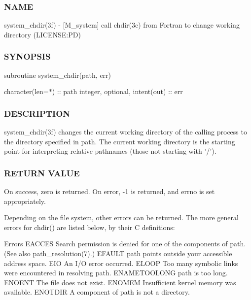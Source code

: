\subsubsection*{N\+A\+ME}

system\+\_\+chdir(3f) -\/ \mbox{[}M\+\_\+system\mbox{]} call chdir(3c) from Fortran to change working directory (L\+I\+C\+E\+N\+SE\+:PD) \subsubsection*{S\+Y\+N\+O\+P\+S\+IS}

subroutine system\+\_\+chdir(path, err)

character(len=$\ast$) \+:\+: path integer, optional, intent(out) \+:\+: err

\subsubsection*{D\+E\+S\+C\+R\+I\+P\+T\+I\+ON}

\begin{DoxyVerb}system_chdir(3f) changes the current working directory of the calling
process to the directory specified in path. The current working
directory is the starting point for interpreting relative pathnames
(those not starting with '/').
\end{DoxyVerb}


\subsubsection*{R\+E\+T\+U\+RN V\+A\+L\+UE}

\begin{DoxyVerb}On success, zero is returned. On error, -1 is returned, and errno is
set appropriately.


Depending on the file system, other errors can be returned. The more
general errors for chdir() are listed below, by their C definitions:

Errors
EACCES        Search permission is denied for one of the components of path.
              (See also path_resolution(7).)
EFAULT        path points outside your accessible address space.
EIO           An I/O error occurred.
ELOOP         Too many symbolic links were encountered in resolving path.
ENAMETOOLONG  path is too long.
ENOENT        The file does not exist.
ENOMEM        Insufficient kernel memory was available.
ENOTDIR       A component of path is not a directory.
\end{DoxyVerb}


